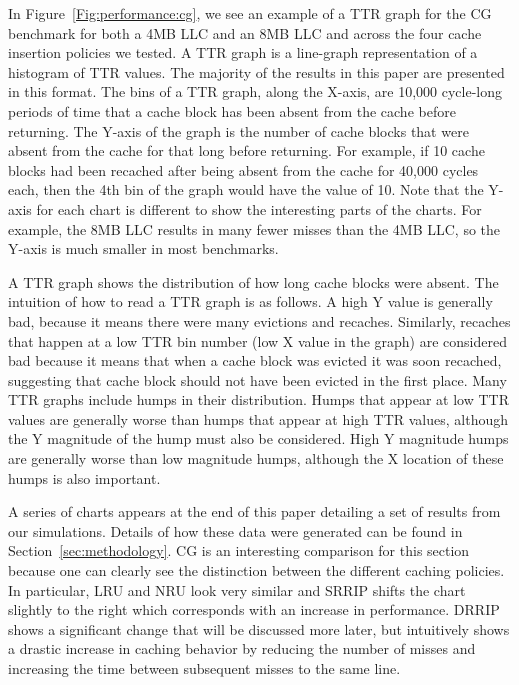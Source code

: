 \begin{figure*}
\caption{CG Time to Recache}
\label{Fig:performance:cg}
\end{figure*}

In Figure~\ref{Fig:performance:cg}, we see an example of a TTR graph for 
the CG benchmark for both a 4MB LLC and an 8MB LLC and across the four 
cache insertion policies we tested.  
A TTR graph is a line-graph representation of a histogram of TTR values.  
The majority of the results in this paper are presented in this format.  
The bins of a TTR graph, along the X-axis,  are 10,000 cycle-long 
periods of time that a cache block has
been absent from the cache before returning.  The Y-axis of the graph
is the number of cache blocks that were absent from the cache for that
long before returning.  For example, if 10 cache blocks had been
recached after being absent from the cache for 40,000 cycles each,
then the 4th bin of the graph would have the value of 10.
Note that the Y-axis for each chart is different to show the interesting parts of the charts.
For example, the 8MB LLC results in many fewer misses than the 4MB LLC, 
so the Y-axis is much smaller in most benchmarks.

A TTR graph shows the distribution of how long cache blocks were
absent.  The intuition of how to read a TTR graph is as follows.  A
high Y value is generally bad, because it means there were many evictions
and recaches.  Similarly, recaches that happen at a low TTR bin number
(low X value in the graph) are considered bad because it means that
when a cache block was evicted it was soon recached, suggesting that
cache block should not have been evicted in the first place.  Many TTR
graphs include humps in their distribution.  Humps that appear at low
TTR values are generally worse than humps that appear at high TTR
values, although the Y magnitude of the hump must also be considered.
High Y magnitude humps are generally worse than low magnitude humps,
although the X location of these humps is also important.

A series of charts appears at the end of this paper detailing a set of 
results from our simulations.
Details of how these data were generated can be found in Section~\ref{sec:methodology}.
CG is an interesting comparison for this section because one can clearly 
see the distinction between the different caching policies. 
In particular, LRU and NRU look very similar and SRRIP shifts the chart 
slightly to the right which corresponds with an increase in performance.
DRRIP shows a significant change that will be discussed more later, but 
intuitively shows a drastic increase in caching behavior by reducing the 
number of misses and increasing the time between subsequent misses to the 
same line.
